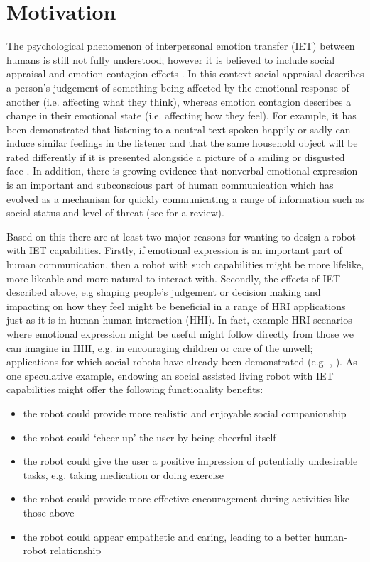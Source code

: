 \documentclass[11pt]{article}
\begin{document}
\section{Motivation}
The psychological phenomenon of interpersonal emotion transfer (IET) between humans is still not fully understood; however it is believed to include social appraisal and emotion contagion effects \cite{parkinson2011interpersonal}. In this context social appraisal describes a person's judgement of something being affected by the emotional response of another (i.e. affecting what they think), whereas emotion contagion describes a change in their emotional state (i.e. affecting how they feel). For example, it has been demonstrated that listening to a neutral text spoken happily or sadly can induce similar feelings in the listener \cite{neumann2000mood} and that the same household object will be rated differently if it is presented alongside a picture of a smiling or disgusted face \cite{bayliss2007affective}. In addition, there is growing evidence that nonverbal emotional expression is an important and subconscious part of human communication which has evolved as a mechanism for quickly communicating a range of information such as social status and level of threat (see \cite{tracy2015nonverbal} for a review). 

Based on this there are at least two major reasons for wanting to design a robot with IET capabilities. Firstly, if emotional expression is an important part of human communication, then a robot with such capabilities might be more lifelike, more likeable and more natural to interact with. Secondly, the effects of IET described above, e.g shaping people's judgement or decision making and impacting on how they feel might be beneficial in a range of HRI applications just as it is in human-human interaction (HHI). In fact, example HRI scenarios where emotional expression might be useful might follow directly from those we can imagine in HHI, e.g. in encouraging children or care of the unwell; applications for which social robots have already been demonstrated (e.g. \cite{shiomi2015can}, \cite{gockley2006encouraging}). As one speculative example, endowing an social assisted living robot with IET  capabilities might offer the following functionality benefits: 
\begin{itemize}
\item the robot could provide more realistic and enjoyable social companionship
\item the robot could `cheer up' the user by being cheerful itself
\item the robot could give the user a positive impression of potentially undesirable tasks, e.g. taking medication or doing exercise
\item the robot could provide more effective encouragement during activities like those above
\item the robot could appear empathetic and caring, leading to a better human-robot relationship
\end{itemize}
\end{document}
